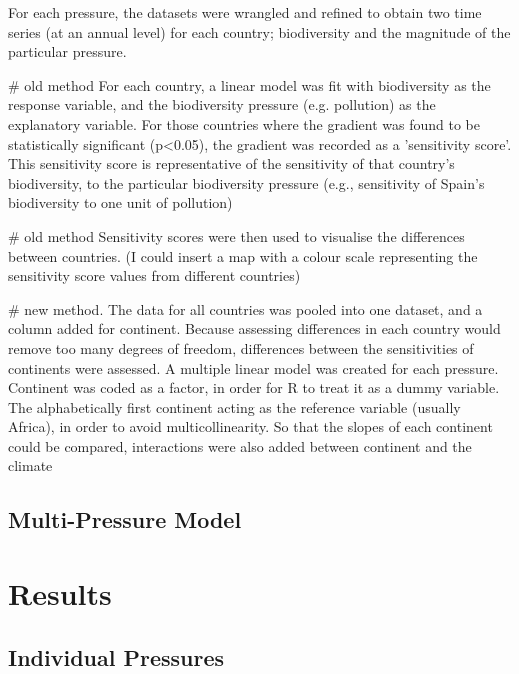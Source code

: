 \documentclass[11pt, a4paper, titlepage]{article}
\begin{document}
	For each pressure, the datasets were wrangled and refined to obtain two time series (at an annual level) for each country; biodiversity and the magnitude of the particular pressure. 
	
	# old method For each country, a linear model was fit with biodiversity as the response variable, and the biodiversity pressure (e.g. pollution) as the explanatory variable. For those countries where the gradient was found to be statistically significant (p<0.05), the gradient was recorded as a 'sensitivity score'. This sensitivity score is representative of the sensitivity of that country's biodiversity, to the particular biodiversity pressure (e.g., sensitivity of Spain's biodiversity to one unit of pollution) \newline
	
	# old method Sensitivity scores were then used to visualise the differences between countries. (I could insert a map with a colour scale representing the sensitivity score values from different countries) \newline
	
	# new method. The data for all countries was pooled into one dataset, and a column added for continent. Because assessing differences in each country would remove too many degrees of freedom, differences between the sensitivities of continents were assessed. A multiple linear model was created for each pressure. Continent was coded as a factor, in order for R to treat it as a dummy variable. The alphabetically first continent acting as the reference variable (usually Africa), in order to avoid multicollinearity. So that the slopes of each continent could be compared, interactions were also added between continent and the climate
	
	
	
	\subsection*{Multi-Pressure Model}
	
	
	
		
	 
	
	
	

	\clearpage

	 \section*{Results}
	 
	 \subsection*{Individual Pressures}
	 
\end{document}
